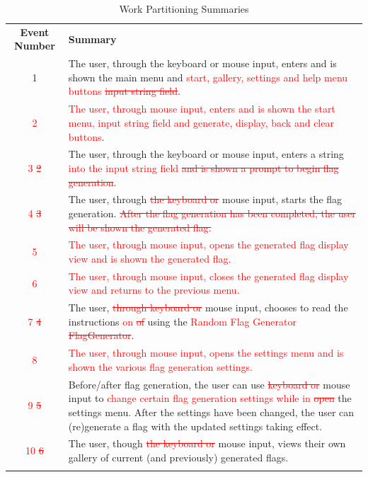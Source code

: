 \documentclass[12pt, titlepage]{article}
\begin{document}
\begin{table}[h!]
    \centering
    \caption{Work Partitioning Summaries}
    \begin{tabularx}{\textwidth}{|c|X|}
        \hhline{|-|-|}
        \textbf{Event Number} & \textbf{Summary} \\
        \hhline{|-|-|}
        1 & The user, through the keyboard or mouse input, enters and is shown the main menu and \textcolor{red}{start, gallery, settings and help menu buttons \sout{input string field}}. \\
        \hhline{|-|-|}
        \textcolor{red}{2} & \textcolor{red}{The user, through mouse input, enters and is shown the start menu, input string field and generate, display, back and clear buttons}. \\
        \hhline{|-|-|}
        \textcolor{red}{3 \sout{2}} & The user, through the keyboard or mouse input, enters a string \textcolor{red}{into the input string field \sout{and is shown a prompt to begin flag generation}}. \\
        \hhline{|-|-|}
        \textcolor{red}{4 \sout{3}} & The user, through \textcolor{red}{\sout{the keyboard or}} mouse input, starts the flag generation. \textcolor{red}{\sout{After the flag generation has been completed, the user will be shown the generated flag.}} \\
        \hhline{|-|-|}
        \textcolor{red}{5} & \textcolor{red}{The user, through mouse input, opens the generated flag display view and is shown the generated flag.} \\
        \hhline{|-|-|}
        \textcolor{red}{6} & \textcolor{red}{The user, through mouse input, closes the generated flag display view and returns to the previous menu.} \\
        \hhline{|-|-|}
        \textcolor{red}{7 \sout{4}} & The user, \textcolor{red}{\sout{through keyboard or}} mouse input, chooses to read the instructions \textcolor{red}{on \sout{of}} using the \textcolor{red}{Random Flag Generator \sout{FlagGenerator}}. \\
        \hhline{|-|-|}
        \textcolor{red}{8} & \textcolor{red}{The user, through mouse input, opens the settings menu and is shown the various flag generation settings.} \\
        \hhline{|-|-|}
        \textcolor{red}{9 \sout{5}} & Before/after flag generation, the user can use \textcolor{red}{\sout{keyboard or}} mouse input to \textcolor{red}{change certain flag generation settings while in \sout{open}} the settings menu. After the settings have been changed, the user can (re)generate a flag with the updated settings taking effect. \\
        \hhline{|-|-|}
        \textcolor{red}{10 \sout{6}} & The user, though \textcolor{red}{\sout{the keyboard or}} mouse input, views their own gallery of current (and previously) generated flags. \\
        \hhline{|-|-|}
    \end{tabularx}
\end{table}
\end{document}

